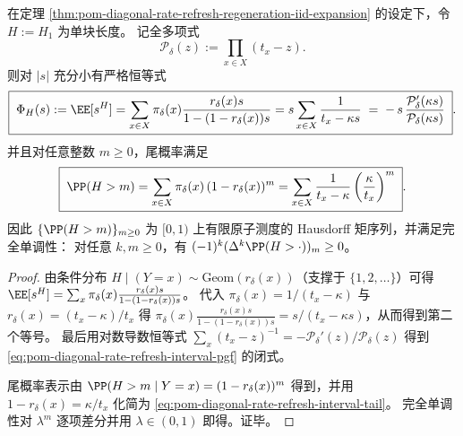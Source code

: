 \begin{proposition}\label{prop:pom-diagonal-rate-refresh-interval-pgf-logderivative}
在定理 \ref{thm:pom-diagonal-rate-refresh-regeneration-iid-expansion} 的设定下，令 \(H:=H_1\) 为单块长度。
记全多项式
\[
\mathcal P_\delta(z):=\prod_{x\in X}(t_x-z).
\]
则对 \(|s|\) 充分小有严格恒等式
\begin{equation}\label{eq:pom-diagonal-rate-refresh-interval-pgf}
\boxed{\;
\Phi_H(s):=\EE[s^{H}]
=\sum_{x\in X}\pi_\delta(x)\frac{r_\delta(x)s}{1-(1-r_\delta(x))s}
=s\sum_{x\in X}\frac{1}{t_x-\kappa s}
\;=\;-\,s\,\frac{\mathcal P_\delta'(\kappa s)}{\mathcal P_\delta(\kappa s)}\; } .
\end{equation}
并且对任意整数 \(m\ge 0\)，尾概率满足
\begin{equation}\label{eq:pom-diagonal-rate-refresh-interval-tail}
\boxed{\;
\PP(H>m)=\sum_{x\in X}\pi_\delta(x)\,(1-r_\delta(x))^{m}
=\sum_{x\in X}\frac{1}{t_x-\kappa}\left(\frac{\kappa}{t_x}\right)^{m}\; } .
\end{equation}
因此 \(\{\PP(H>m)\}_{m\ge 0}\) 为 \([0,1)\) 上有限原子测度的 Hausdorff 矩序列，并满足完全单调性：
对任意 \(k,m\ge 0\)，有 \(({-1})^{k}(\Delta^{k}\PP(H>\cdot))_{m}\ge 0\)。
\end{proposition}
\begin{proof}
由条件分布 \(H\mid(Y=x)\sim\mathrm{Geom}(r_\delta(x))\)（支撑于 \(\{1,2,\dots\}\)）可得
\(
\EE[s^H]=\sum_x\pi_\delta(x)\frac{r_\delta(x)s}{1-(1-r_\delta(x))s}
\)。
代入 \(\pi_\delta(x)=1/(t_x-\kappa)\) 与 \(r_\delta(x)=(t_x-\kappa)/t_x\) 得
\(
\pi_\delta(x)\frac{r_\delta(x)s}{1-(1-r_\delta(x))s}
=s/(t_x-\kappa s)
\)，从而得到第二个等号。
最后用对数导数恒等式
\(
\sum_x(t_x-z)^{-1}=-\mathcal P_\delta'(z)/\mathcal P_\delta(z)
\)
得到 \eqref{eq:pom-diagonal-rate-refresh-interval-pgf} 的闭式。
\par
尾概率表示由 \(\PP(H>m\mid Y=x)=(1-r_\delta(x))^m\) 得到，并用 \(1-r_\delta(x)=\kappa/t_x\) 化简为 \eqref{eq:pom-diagonal-rate-refresh-interval-tail}。
完全单调性对 \(\lambda^m\) 逐项差分并用 \(\lambda\in(0,1)\) 即得。证毕。
\end{proof}

